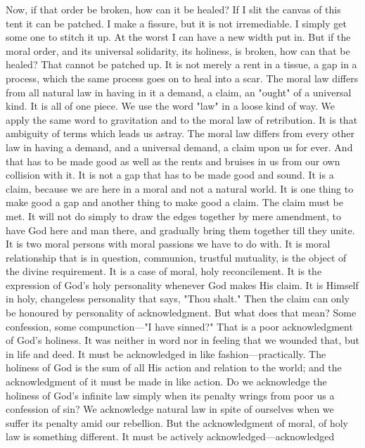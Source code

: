 \documentclass[draft]{ptfdoc}
\begin{document}
Now, if that order be broken, how can it be 
healed? If I slit the canvas of this tent it can 
be patched. I make a fissure, but it is not irremediable. 
I simply get some one to stitch it up. 
At the worst I can have a new width put in. But 
if the moral order, and its universal solidarity, its 
holiness, is broken, how can that be healed? 
That cannot be patched up. It is not merely a 
rent in a tissue, a gap in a process, which the 
same process goes on to heal into a scar. The 
moral law differs from all natural law in having 
in it a demand, a claim, an "ought" of a 
universal kind. It is all of one piece. We use the 
word "law" in a loose kind of way. We apply 
the same word to gravitation and to the moral 
law of retribution. It is that ambiguity of terms 
which leads us astray. The moral law differs 
from every other law in having a demand, and a 
universal demand, a claim upon us for ever. 
And that has to be made good as well as the 
rents and bruises in us from our own collision 
with it. It is not a gap that has to be made 
good and sound. It is a claim, because we are 
here in a moral and not a natural world. It is 
one thing to make good a gap and another thing 
to make good a claim. The claim must be met. 
It will not do simply to draw the edges together 
by mere amendment, to have God here and man 
there, and gradually bring them together till 
they unite. It is two moral persons with 
moral passions we have to do with. It is moral 
relationship that is in question, communion, 
trustful mutuality, is the object of the divine 
requirement. It is a case of moral, holy reconcilement. 
It is the expression of God's holy 
personality whenever God makes His claim. 
It is Himself in holy, changeless personality 
that says, "Thou shalt." Then the claim can 
only be honoured by personality of acknowledgment. 
But what does that mean? Some 
confession, some compunction---"I have sinned?" 
That is a poor acknowledgment of God's holiness. 
It was neither in word nor in feeling that 
we wounded that, but in life and deed. It must 
be acknowledged in like fashion---practically. 
The holiness of God is the sum of all His action 
and relation to the world; and the acknowledgment 
of it must be made in like action. Do we 
acknowledge the holiness of God's infinite law 
simply when its penalty wrings from poor us a 
confession of sin? We acknowledge natural 
law in spite of ourselves when we suffer its 
penalty amid our rebellion. But the acknowledgment 
of moral, of holy law is something 
different. It must be actively acknowledged---acknowledged 
\end{document}
